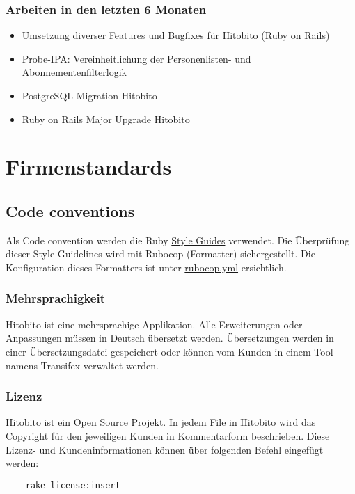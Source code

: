 \subsection{Arbeiten in den letzten 6 Monaten}
\begin{itemize}
    \item Umsetzung diverser Features und Bugfixes für Hitobito (Ruby on Rails)
    \item Probe-IPA: Vereinheitlichung der Personenlisten- und Abonnementenfilterlogik
    \item PostgreSQL Migration Hitobito
    \item Ruby on Rails Major Upgrade Hitobito
\end{itemize}

\chapter{Firmenstandards}

\section{Code conventions}
Als Code convention werden die Ruby \href{https://github.com/rubocop/ruby-style-guide}{Style Guides} verwendet. 
Die Überprüfung dieser Style Guidelines wird mit Rubocop (Formatter) sichergestellt. Die Konfiguration
dieses Formatters ist unter \href{https://github.com/hitobito/hitobito/blob/master/.rubocop.yml}{rubocop.yml} ersichtlich.

\subsection{Mehrsprachigkeit}
Hitobito ist eine mehrsprachige Applikation. Alle Erweiterungen oder Anpassungen müssen
in Deutsch übersetzt werden. Übersetzungen werden in einer Übersetzungsdatei gespeichert oder können
vom Kunden in einem Tool namens Transifex verwaltet werden.

\subsection{Lizenz}
Hitobito ist ein Open Source Projekt.
In jedem File in Hitobito wird das Copyright für den jeweiligen Kunden in Kommentarform beschrieben. 
Diese Lizenz- und Kundeninformationen können über folgenden Befehl 
eingefügt werden:

\begin{verbatim}
    rake license:insert
\end{verbatim}

